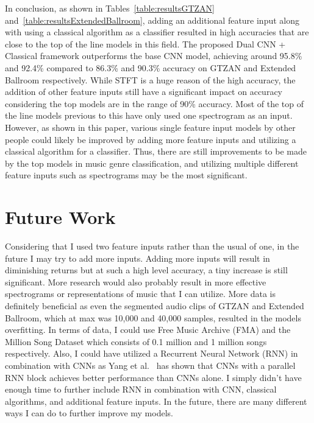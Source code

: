 \documentclass[10pt,twocolumn,letterpaper]{article}
\begin{document}
	In conclusion, as shown in Tables~\ref{table:resultsGTZAN} and~\ref{table:resultsExtendedBallroom}, adding an additional feature input along with using a classical algorithm as a classifier resulted in high accuracies that are close to the top of the line models in this field. The proposed Dual CNN + Classical framework outperforms the base CNN model, achieving around 95.8\% and 92.4\% compared to 86.3\% and 90.3\% accuracy on GTZAN and Extended Ballroom respectively. While STFT is a huge reason of the high accuracy, the addition of other feature inputs still have a significant impact on accuracy considering the top models are in the range of 90\% accuracy. Most of the top of the line models previous to this have only used one spectrogram as an input. However, as shown in this paper, various single feature input models by other people could likely be improved by adding more feature inputs and utilizing a classical algorithm for a classifier. Thus, there are still improvements to be made by the top models in music genre classification, and utilizing multiple different feature inputs such as spectrograms may be the most significant.
	
	\section{Future Work} %
	
	Considering that I used two feature inputs rather than the usual of one, in the future I may try to add more inputs. Adding more inputs will result in diminishing returns but at such a high level accuracy, a tiny increase is still significant. More research would also probably result in more effective spectrograms or representations of music that I can utilize. More data is definitely beneficial as even the segmented audio clips of GTZAN and Extended Ballroom, which at max was 10,000 and 40,000 samples, resulted in the models overfitting. In terms of data, I could use Free Music Archive (FMA) and the Million Song Dataset which consists of 0.1 million and 1 million songs respectively. Also, I could have utilized a Recurrent Neural Network (RNN) in combination with CNNs as Yang et al.~\cite{yang2020parallel} has shown that CNNs with a parallel RNN block achieves better performance than CNNs alone. I simply didn't have enough time to further include RNN in combination with CNN, classical algorithms, and additional feature inputs. In the future, there are many different ways I can do to further improve my models.
		
	{\small
		
		
	}
\end{document}
